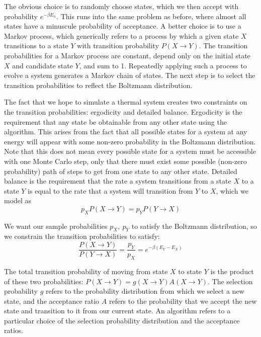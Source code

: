 \documentclass[twocolumn,aps,prl]{revtex4-1} %
\begin{document}
The obvious choice is to randomly choose states, which we then accept with probability $e^{-\beta E_n}$. This runs into the same problem as before, where almost all states have a minuscule probability of acceptance. A better choice is to use a Markov process, which generically refers to a process by which a given state $X$ transitions to a state $Y$ with transition probability $P(X \to Y)$. The transition probabilities for a Markov process are constant, depend only on the initial state $X$ and candidate state $Y$, and sum to 1. Repeatedly applying such a process to evolve a system generates a Markov chain of states. The next step is to select the transition probabilities to reflect the Boltzmann distribution.

The fact that we hope to simulate a thermal system creates two constraints on the transition probabilities: ergodicity and detailed balance. Ergodicity is the requirement that any state be obtainable from any other state using the algorithm. This arises from the fact that all possible states for a system at any energy will appear with some non-zero probability in the Boltzmann distribution. Note that this does not mean every possible state for a system must be accessible with one Monte Carlo step, only that there must exist some possible (non-zero probability) path of steps to get from one state to any other state. Detailed balance is the requirement that the rate a system transitions from a state $X$ to a state $Y$ is equal to the rate that a system will transition from $Y$ to $X$, which we model as 
\begin{equation}
	p_XP(X \to Y) = p_YP(Y \to X)
\end{equation}

We want our sample probabilities $p_X,\ p_Y$ to satisfy the Boltzmann distribution, so we constrain the transition probabilities to satisfy:
\begin{equation}
\frac{P(X \to Y)}{P(Y \to X)} = \frac{p_Y}{p_X} = e^{-\beta(E_Y - E_X)}
\end{equation}

The total transition probability of moving from state $X$ to state $Y$ is the product of these two probabilities: $P(X \to Y) = g(X \to Y)A(X \to Y)$. The selection probability $g$ refers to the probability distribution from which we select a new state, and the acceptance ratio $A$ refers to the probability that we accept the new state and transition to it from our current state. An algorithm refers to a particular choice of the selection probability distribution and the acceptance ratios.
\end{document}
